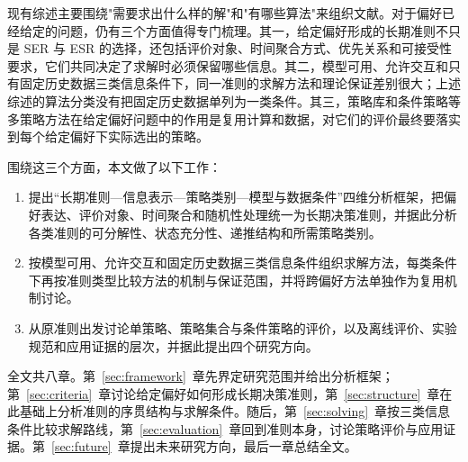 现有综述主要围绕"需要求出什么样的解"和"有哪些算法"来组织文献。对于偏好已经给定的问题，仍有三个方面值得专门梳理。其一，给定偏好形成的长期准则不只是 SER 与 ESR 的选择，还包括评价对象、时间聚合方式、优先关系和可接受性要求，它们共同决定了求解时必须保留哪些信息。其二，模型可用、允许交互和只有固定历史数据三类信息条件下，同一准则的求解方法和理论保证差别很大；上述综述的算法分类没有把固定历史数据单列为一类条件。其三，策略库和条件策略等多策略方法在给定偏好问题中的作用是复用计算和数据，对它们的评价最终要落实到每个给定偏好下实际选出的策略。

围绕这三个方面，本文做了以下工作：
\begin{enumerate}
\item 提出“长期准则---信息表示---策略类别---模型与数据条件”四维分析框架，把偏好表达、评价对象、时间聚合和随机性处理统一为长期决策准则，并据此分析各类准则的可分解性、状态充分性、递推结构和所需策略类别。
\item 按模型可用、允许交互和固定历史数据三类信息条件组织求解方法，每类条件下再按准则类型比较方法的机制与保证范围，并将跨偏好方法单独作为复用机制讨论。
\item 从原准则出发讨论单策略、策略集合与条件策略的评价，以及离线评价、实验规范和应用证据的层次，并据此提出四个研究方向。
\end{enumerate}

全文共八章。第~\ref{sec:framework}~章先界定研究范围并给出分析框架；第~\ref{sec:criteria}~章讨论给定偏好如何形成长期决策准则，第~\ref{sec:structure}~章在此基础上分析准则的序贯结构与求解条件。随后，第~\ref{sec:solving}~章按三类信息条件比较求解路线，第~\ref{sec:evaluation}~章回到准则本身，讨论策略评价与应用证据。第~\ref{sec:future}~章提出未来研究方向，最后一章总结全文。
